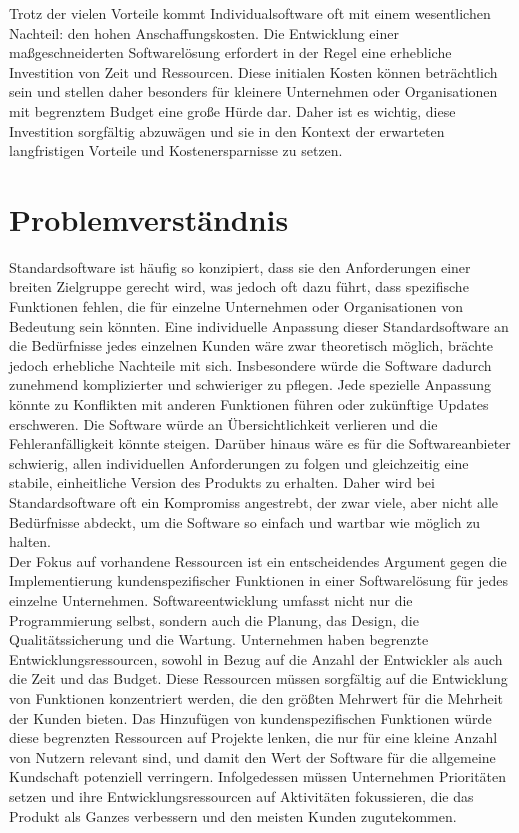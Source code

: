Trotz der vielen Vorteile kommt Individualsoftware oft mit einem wesentlichen Nachteil: 
den hohen Anschaffungskosten. Die Entwicklung einer maßgeschneiderten Softwarelösung 
erfordert in der Regel eine erhebliche Investition von Zeit und Ressourcen. 
Diese initialen Kosten können beträchtlich sein und stellen daher besonders für 
kleinere Unternehmen oder Organisationen mit begrenztem Budget eine große Hürde dar. 
Daher ist es wichtig, diese Investition sorgfältig abzuwägen und sie in den Kontext der 
erwarteten langfristigen Vorteile und Kostenersparnisse zu setzen.

\newpage
\section{Problemverständnis}

Standardsoftware ist häufig so konzipiert, dass sie den Anforderungen einer breiten 
Zielgruppe gerecht wird, was jedoch oft dazu führt, dass spezifische Funktionen fehlen, 
die für einzelne Unternehmen oder Organisationen von Bedeutung sein könnten. 
Eine individuelle Anpassung dieser Standardsoftware an die Bedürfnisse jedes einzelnen 
Kunden wäre zwar theoretisch möglich, brächte jedoch erhebliche Nachteile mit sich. 
Insbesondere würde die Software dadurch zunehmend komplizierter und 
schwieriger zu pflegen. Jede spezielle Anpassung könnte zu Konflikten mit 
anderen Funktionen führen oder zukünftige Updates erschweren. Die Software würde an 
Übersichtlichkeit verlieren und die Fehleranfälligkeit könnte steigen. 
Darüber hinaus wäre es für die Softwareanbieter schwierig, allen individuellen 
Anforderungen zu folgen und gleichzeitig eine stabile, einheitliche 
Version des Produkts zu erhalten. Daher wird bei Standardsoftware oft ein Kompromiss 
angestrebt, der zwar viele, aber nicht alle Bedürfnisse abdeckt, um die Software so 
einfach und wartbar wie möglich zu halten.\\

Der Fokus auf vorhandene Ressourcen ist ein entscheidendes Argument gegen die Implementierung 
kundenspezifischer Funktionen in einer Softwarelösung für jedes einzelne Unternehmen. 
Softwareentwicklung umfasst nicht nur die Programmierung selbst, sondern auch die Planung, 
das Design, die Qualitätssicherung und die Wartung. Unternehmen haben begrenzte 
Entwicklungsressourcen, sowohl in Bezug auf die Anzahl der Entwickler als auch die Zeit und 
das Budget. Diese Ressourcen müssen sorgfältig auf die Entwicklung von Funktionen konzentriert 
werden, die den größten Mehrwert für die Mehrheit der Kunden bieten. Das Hinzufügen von 
kundenspezifischen Funktionen würde diese begrenzten Ressourcen auf Projekte lenken, 
die nur für eine kleine Anzahl von Nutzern relevant sind, und damit den Wert der Software 
für die allgemeine Kundschaft potenziell verringern. Infolgedessen müssen Unternehmen 
Prioritäten setzen und ihre Entwicklungsressourcen auf Aktivitäten fokussieren, 
die das Produkt als Ganzes verbessern und den meisten Kunden zugutekommen.

